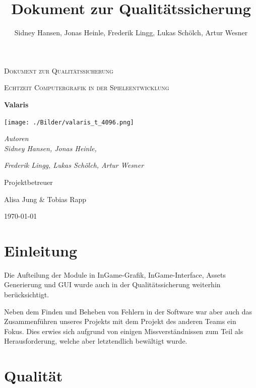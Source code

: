 \documentclass[parskip=full]{scrartcl}
\title{Dokument zur Qualitätssicherung}
\author{Sidney Hansen, Jonas Heinle, Frederik Lingg, Lukas Schölch, Artur Wesner}
\newcommand{\codename}{Valaris}
\begin{document}
 
	\begin{titlepage}
		\centering
		{\scshape\LARGE Dokument zur Qualitätssicherung\par}
		\vspace{1cm}
		{\scshape\Large Echtzeit Computergrafik in der Spieleentwicklung \par}
		\vspace{1cm}
		{\huge\bfseries \codename \par}
		\vspace{1cm}
		\texttt{[image: ./Bilder/valaris\_t\_4096.png]}
		\par
		{\vspace{1cm}}
		{\Large\itshape Autoren \\}
		{\Large\itshape Sidney Hansen, Jonas Heinle,\\}
		{\Large\itshape Frederik Lingg, Lukas Schölch, Artur Wesner\par}
		
		\vfill
		Projektbetreuer\par
		Alisa Jung \& Tobias Rapp
		
		\vfill
		
		{\large \today\par}
	\end{titlepage}

	\tableofcontents 
	\pagebreak
	
	
	\pagebreak
	
	\section{Einleitung} 

	Die Aufteilung der Module in InGame-Grafik, InGame-Interface, Assets Generierung und GUI wurde auch in der Qualitätssicherung weiterhin berücksichtigt.
	
	Neben dem Finden und Beheben von Fehlern in der Software war aber auch das Zusammenführen unseres Projekts mit dem Projekt des anderen Teams ein Fokus.
	Dies erwies sich aufgrund von einigen Missverständnissen zum Teil als Herausforderung, welche aber letztendlich bewältigt wurde.

	\section{Qualität}
\end{document}
